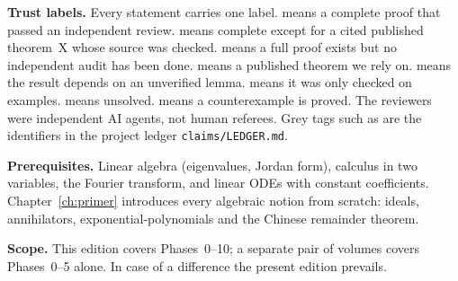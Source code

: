\textbf{Trust labels.} Every statement carries one label. \proved{} means a complete proof that passed an independent review.  means complete except for a cited published theorem~X whose source was checked. \pw{} means a full proof exists but no independent audit has been done. \cf{} means a published theorem we rely on. \condl{} means the result depends on an unverified lemma. \vex{} means it was only checked on examples. \openq{} means unsolved. \falsest{} means a counterexample is proved. The reviewers were independent AI agents, not human referees. Grey tags such as  are the identifiers in the project ledger \texttt{claims/LEDGER.md}.

\textbf{Prerequisites.} Linear algebra (eigenvalues, Jordan form), calculus in two variables, the Fourier transform, and linear ODEs with constant coefficients. Chapter~\ref{ch:primer} introduces every algebraic notion from scratch: ideals, annihilators, exponential-polynomials and the Chinese remainder theorem.

\textbf{Scope.} This edition covers Phases~0--10; a separate pair of volumes covers Phases~0--5 alone. In case of a difference the present edition prevails. 

